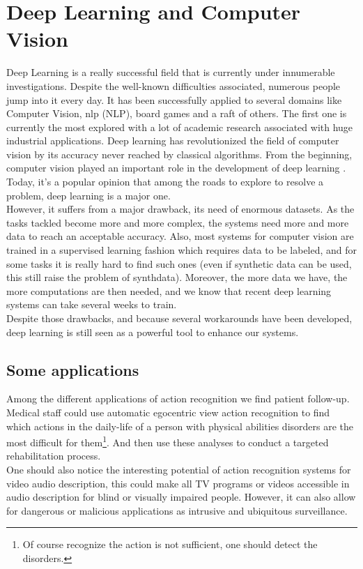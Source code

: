 \documentclass[12pt, a4paper]{report}
\begin{document}
		\section{Deep Learning and Computer Vision}\label{dl_cv}
			Deep Learning is a really successful field that is currently under innumerable investigations.
			Despite the well-known difficulties associated, numerous people jump into it every day.
			It has been successfully applied to several domains like Computer Vision, \gls{nlp} (NLP), board games and a raft of others.
			The first one is currently the most explored with a lot of academic research associated with huge industrial applications.
			Deep learning has revolutionized the field of computer vision by its accuracy never reached by classical algorithms.
			From the beginning, computer vision played an important role in the development of deep learning \cite{lecun_89,lecun_98}.
			Today, it's a popular opinion that among the roads to explore to resolve a problem, deep learning is a major one.\\
			However, it suffers from a major drawback, its need of enormous datasets.
			As the tasks tackled become more and more complex, the systems need more and more data to reach an acceptable accuracy.
			Also, most systems for computer vision are trained in a supervised learning fashion which requires data to be labeled, and for some tasks it is really hard to find such ones (even if synthetic data can be used, this still raise the problem of \gls{synthdata}).
			Moreover, the more data we have, the more computations are then needed, and we know that recent deep learning systems can take several weeks to train.\\
			
			Despite those drawbacks, and because several workarounds have been developed, deep learning is still seen as a powerful tool to enhance our systems.

	
			\subsection*{Some applications}
				Among the different applications of action recognition we find patient follow-up.
				Medical staff could use automatic egocentric view action recognition to find which actions in the daily-life of a person with physical abilities disorders are the most difficult for them\footnote{Of course recognize the action is not sufficient, one should detect the disorders.}.
				And then use these analyses to conduct a targeted rehabilitation process.\\
				One should also notice the interesting potential of action recognition systems for video audio description, this could make all TV programs or videos accessible in audio description for blind or visually impaired people.
				However, it can also allow for dangerous or malicious applications as intrusive and ubiquitous surveillance.
\end{document}
